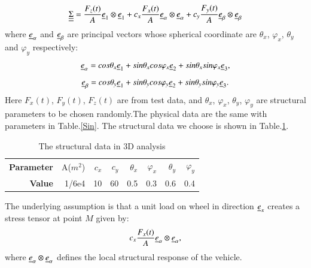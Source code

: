 \documentclass[3p,times,procedia,number]{elsarticle}
\begin{document}
\begin{equation}
	\uline{\uline{\Sigma}}=\dfrac{F_z(t)}{A}\uline{e}_1\otimes \uline{e}_1+c_x\dfrac{F_x(t)}{A}\uline{e}_{\alpha}\otimes \uline{e}_{\alpha}+c_y\dfrac{F_y(t)}{A}\uline{e}_{\beta}\otimes \uline{e}_{\beta}
	\label{tensor1}
\end{equation}
where $\uline{e}_{\alpha}$  and $\uline{e}_{\beta}$ are principal vectors whose spherical coordinate are $\theta_x$, $\varphi_x$,  $\theta_y$ and $\varphi_y$ respectively:
$$\uline{e}_{\alpha}=cos\theta_x\uline{e}_1+sin\theta_xcos\varphi_x\uline{e}_2+sin\theta_xsin\varphi_x\uline{e}_3,$$
$$\uline{e}_{\beta}=cos\theta_y\uline{e}_1+sin\theta_ycos\varphi_y\uline{e}_2+sin\theta_ysin\varphi_y\uline{e}_3.$$
Here $F_x(t)$, $F_y(t)$, $F_z(t)$ are from test data, and $\theta_x$, $\varphi_x$, $\theta_y$, $\varphi_y$ are structural parameters to be chosen randomly.The physical data are the same with parameters in Table.\ref{Sin}. The structural data we choose is shown in Table.\ref{structural}.

\begin{table}[!h]
	\centering
	\begin{tabular}{rrrrrrrr}
		\hline
		\textbf{Parameter} & A($m^2$) & $c_x$ & $c_y$ & $\theta_x$ & $\varphi_x$ & $\theta_y$ & $\varphi_y$ \\
		\textbf{Value}      & 1/6e4                  & 10    & 60    & 0.5        & 0.3         & 0.6        & 0.4         \\ \hline
	\end{tabular}
	\caption{The structural data in 3D analysis}
	\label{structural}
\end{table}

The underlying assumption is that a unit load on wheel in direction $\uline{e}_x$ creates a stress tensor at point $M$ given by:
$$c_x\dfrac{F_x(t)}{A}\uline{e}_{\alpha}\otimes \uline{e}_{\alpha},$$
where $\uline{e}_{\alpha}\otimes \uline{e}_{\alpha}$ defines the local structural response of the vehicle.
\end{document}
